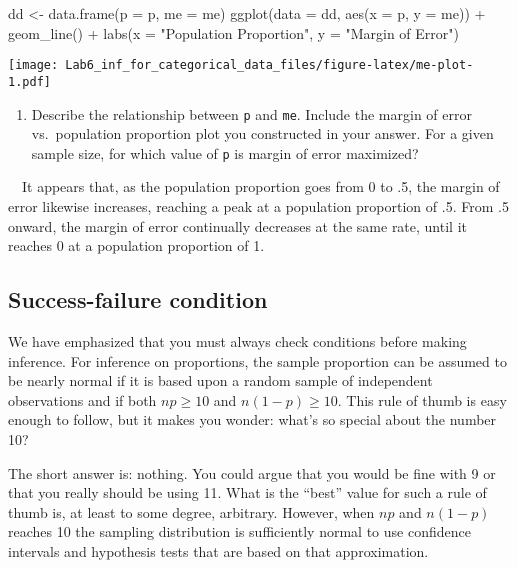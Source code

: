 \documentclass[
]{article}
\newenvironment{Shaded}{\begin{snugshade}}{\end{snugshade}}
\newcommand{\AttributeTok}[1]{\textcolor[rgb]{0.77,0.63,0.00}{#1}}
\newcommand{\FunctionTok}[1]{\textcolor[rgb]{0.00,0.00,0.00}{#1}}
\newcommand{\NormalTok}[1]{#1}
\newcommand{\OtherTok}[1]{\textcolor[rgb]{0.56,0.35,0.01}{#1}}
\newcommand{\SpecialCharTok}[1]{\textcolor[rgb]{0.00,0.00,0.00}{#1}}
\newcommand{\StringTok}[1]{\textcolor[rgb]{0.31,0.60,0.02}{#1}}
\providecommand{\tightlist}{%
  \setlength{\itemsep}{0pt}\setlength{\parskip}{0pt}}
\begin{document}
\begin{Shaded}
\begin{Highlighting}[]
\NormalTok{dd }\OtherTok{\textless{}{-}} \FunctionTok{data.frame}\NormalTok{(}\AttributeTok{p =}\NormalTok{ p, }\AttributeTok{me =}\NormalTok{ me)}
\FunctionTok{ggplot}\NormalTok{(}\AttributeTok{data =}\NormalTok{ dd, }\FunctionTok{aes}\NormalTok{(}\AttributeTok{x =}\NormalTok{ p, }\AttributeTok{y =}\NormalTok{ me)) }\SpecialCharTok{+} 
  \FunctionTok{geom\_line}\NormalTok{() }\SpecialCharTok{+}
  \FunctionTok{labs}\NormalTok{(}\AttributeTok{x =} \StringTok{"Population Proportion"}\NormalTok{, }\AttributeTok{y =} \StringTok{"Margin of Error"}\NormalTok{)}
\end{Highlighting}
\end{Shaded}

\texttt{[image: Lab6\_inf\_for\_categorical\_data\_files/figure-latex/me-plot-1.pdf]}

\begin{enumerate}
\def\labelenumi{\arabic{enumi}.}
\setcounter{enumi}{4}
\tightlist
\item
  Describe the relationship between \texttt{p} and \texttt{me}. Include
  the margin of error vs.~population proportion plot you constructed in
  your answer. For a given sample size, for which value of \texttt{p} is
  margin of error maximized?
\end{enumerate}

~~It appears that, as the population proportion goes from 0 to .5, the
margin of error likewise increases, reaching a peak at a population
proportion of .5. From .5 onward, the margin of error continually
decreases at the same rate, until it reaches 0 at a population
proportion of 1.

\hypertarget{success-failure-condition}{%
\subsection{Success-failure condition}\label{success-failure-condition}}

We have emphasized that you must always check conditions before making
inference. For inference on proportions, the sample proportion can be
assumed to be nearly normal if it is based upon a random sample of
independent observations and if both \(np \geq 10\) and
\(n(1 - p) \geq 10\). This rule of thumb is easy enough to follow, but
it makes you wonder: what's so special about the number 10?

The short answer is: nothing. You could argue that you would be fine
with 9 or that you really should be using 11. What is the ``best'' value
for such a rule of thumb is, at least to some degree, arbitrary.
However, when \(np\) and \(n(1-p)\) reaches 10 the sampling distribution
is sufficiently normal to use confidence intervals and hypothesis tests
that are based on that approximation.
\end{document}
